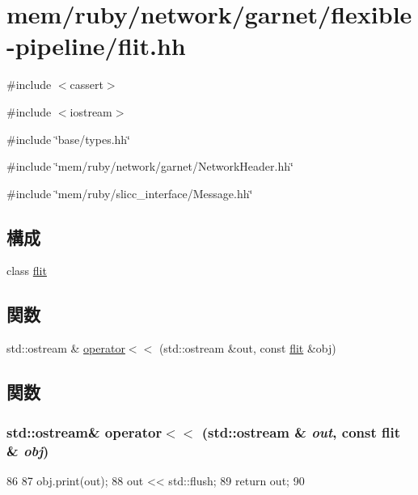 \hypertarget{flit_8hh}{
\section{mem/ruby/network/garnet/flexible-\/pipeline/flit.hh}
\label{flit_8hh}
}
{\ttfamily \#include $<$cassert$>$}\par
{\ttfamily \#include $<$iostream$>$}\par
{\ttfamily \#include \char`\"{}base/types.hh\char`\"{}}\par
{\ttfamily \#include \char`\"{}mem/ruby/network/garnet/NetworkHeader.hh\char`\"{}}\par
{\ttfamily \#include \char`\"{}mem/ruby/slicc\_\-interface/Message.hh\char`\"{}}\par
\subsection*{構成}
\begin{DoxyCompactItemize}
\item 
class \hyperlink{classflit}{flit}
\end{DoxyCompactItemize}
\subsection*{関数}
\begin{DoxyCompactItemize}
\item 
std::ostream \& \hyperlink{flit_8hh_a5f582b8d150287a6d828fae1c7d427b4}{operator$<$$<$} (std::ostream \&out, const \hyperlink{classflit}{flit} \&obj)
\end{DoxyCompactItemize}


\subsection{関数}
\hypertarget{flit_8hh_a5f582b8d150287a6d828fae1c7d427b4}{
\subsubsection[{operator$<$$<$}]{\setlength{\rightskip}{0pt plus 5cm}std::ostream\& operator$<$$<$ (std::ostream \& {\em out}, \/  const {\bf flit} \& {\em obj})}}
\label{flit_8hh_a5f582b8d150287a6d828fae1c7d427b4}



\begin{DoxyCode}
86 {
87     obj.print(out);
88     out << std::flush;
89     return out;
90 }
\end{DoxyCode}
